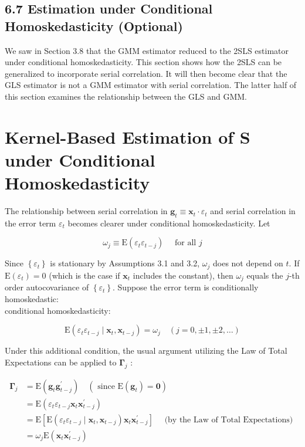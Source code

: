 \documentclass[10pt]{article}
\begin{document}
\subsection*{6.7 Estimation under Conditional Homoskedasticity (Optional)}
We saw in Section 3.8 that the GMM estimator reduced to the 2SLS estimator under conditional homoskedasticity. This section shows how the 2SLS can be generalized to incorporate serial correlation. It will then become clear that the GLS estimator is not a GMM estimator with serial correlation. The latter half of this section examines the relationship between the GLS and GMM.

\section*{Kernel-Based Estimation of $\mathbf{S}$ under Conditional Homoskedasticity}
The relationship between serial correlation in $\mathbf{g}_{t} \equiv \mathbf{x}_{t} \cdot \varepsilon_{t}$ and serial correlation in the error term $\varepsilon_{t}$ becomes clearer under conditional homoskedasticity. Let


\begin{equation*}
\omega_{j} \equiv \mathrm{E}\left(\varepsilon_{t} \varepsilon_{t-j}\right) \quad \text { for all } j \tag{6.7.1}
\end{equation*}


Since $\left\{\varepsilon_{t}\right\}$ is stationary by Assumptions 3.1 and 3.2, $\omega_{j}$ does not depend on $t$. If $\mathrm{E}\left(\varepsilon_{t}\right)=0$ (which is the case if $\mathbf{x}_{t}$ includes the constant), then $\omega_{j}$ equals the $j$-th order autocovariance of $\left\{\varepsilon_{t}\right\}$. Suppose the error term is conditionally homoskedastic:\\
conditional homoskedasticity:


\begin{equation*}
\mathrm{E}\left(\varepsilon_{t} \varepsilon_{t-j} \mid \mathbf{x}_{t}, \mathbf{x}_{t-j}\right)=\omega_{j} \quad(j=0, \pm 1, \pm 2, \ldots) \tag{6.7.2}
\end{equation*}


Under this additional condition, the usual argument utilizing the Law of Total Expectations can be applied to $\boldsymbol{\Gamma}_{j}$ :


\begin{align*}
\boldsymbol{\Gamma}_{j} & =\mathrm{E}\left(\mathbf{g}_{t} \mathbf{g}_{t-j}^{\prime}\right) \quad\left(\text { since } \mathrm{E}\left(\mathbf{g}_{t}\right)=\mathbf{0}\right) \\
& =\mathrm{E}\left(\varepsilon_{t} \varepsilon_{t-j} \mathbf{x}_{t} \mathbf{x}_{t-j}^{\prime}\right) \\
& =\mathrm{E}\left[\mathrm{E}\left(\varepsilon_{t} \varepsilon_{t-j} \mid \mathbf{x}_{t}, \mathbf{x}_{t-j}\right) \mathbf{x}_{t} \mathbf{x}_{t-j}^{\prime}\right] \quad \text { (by the Law of Total Expectations) } \\
& =\omega_{j} \mathrm{E}\left(\mathbf{x}_{t} \mathbf{x}_{t-j}^{\prime}\right) \tag{6.7.3}
\end{align*}
\end{document}
